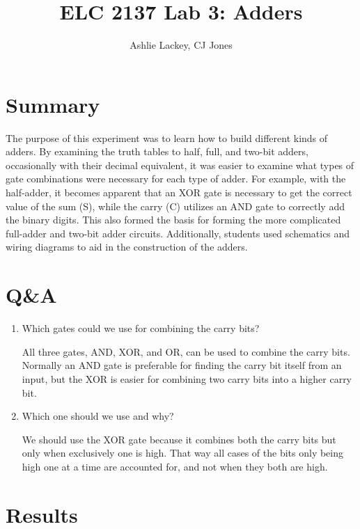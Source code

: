 \documentclass[11pt]{article}
\begin{document}
\title{ELC 2137 Lab 3: Adders }
\author{Ashlie Lackey, CJ Jones}

\maketitle


\section*{Summary}

The purpose of this experiment was to learn how to build different kinds of adders. By examining the truth tables to half, full, and two-bit adders, occasionally with their decimal equivalent, it was easier to examine what types of gate combinations were necessary for each type of adder. For example, with the half-adder, it becomes apparent that an XOR gate is necessary to get the correct value of the sum (S), while the carry (C) utilizes an AND gate to correctly add the binary digits. This also formed the basis for forming the more complicated full-adder and two-bit adder circuits. Additionally, students used schematics and wiring diagrams to aid in the construction of the adders.


\section*{Q\&A}

\begin{enumerate}
	\item Which gates could we use for combining the carry bits?
	
	All three gates, AND, XOR, and OR, can be used to combine the carry bits. Normally an AND gate is preferable for finding the carry bit itself from an input, but the XOR is easier for combining two carry bits into a higher carry bit. 
	
	\item Which one should we use and why?
	
	We should use the XOR gate because it combines both the carry bits but only when exclusively one is high. That way all cases of the bits only being high one at a time are accounted for, and not when they both are high. 
\end{enumerate}




\section*{Results}
\end{document}
